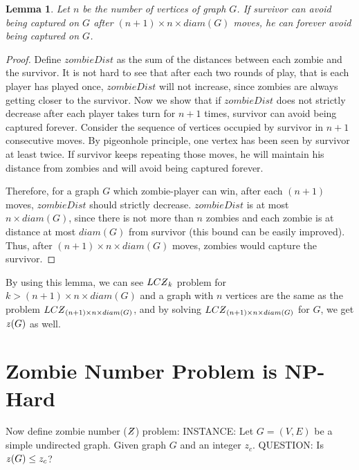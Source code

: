 \documentclass[1p]{elsarticle}
\newtheorem{lemma}[theorem]{Lemma}
\newcommand{\NPZ}{\ooalign{$Z$\cr\hfil\rule[.8ex]{.3em}{.09ex}\hfil\cr}}
\newcommand{\zn}{\ooalign{$z$\cr\hfil\rule[.5ex]{.2em}{.08ex}\hfil\cr}}
\begin{document}
	\begin{lemma}
		\label{limit-moves}
		Let $n$ be the number of vertices of graph $G$. If survivor can avoid being captured on $G$ after $(n + 1)
		\times n \times diam(G)$ moves, he can forever avoid being captured on $G$.
	\end{lemma}
	\begin{proof}
		Define $zombieDist$ as the sum of the distances between each zombie and the survivor. It is not hard to see that
		after each two rounds of play, that is each player has played once, $zombieDist$ will not increase, since
		zombies are always getting closer to the survivor. Now we show that if $zombieDist$ does not strictly decrease
		after each player takes turn for $n + 1$ times, survivor can avoid being captured forever. Consider the sequence
		of vertices occupied by survivor in $n + 1$ consecutive moves. By pigeonhole principle, one vertex has been seen
		by survivor at least twice. If survivor keeps repeating those moves, he will maintain his distance from zombies
		and will avoid being captured forever.

		Therefore, for a graph $G$ which zombie-player can win, after each $(n + 1)$ moves, $zombieDist$ should strictly
		decrease. $zombieDist$ is at most $n \times diam(G)$, since there is not more than $n$ zombies and each zombie is at distance
		at most $diam(G)$ from survivor (this bound can be easily improved). Thus, after $(n + 1) \times n \times diam(G)$ moves, zombies would
		capture the survivor.
	\end{proof}

	By using this lemma, we can see $LC\NPZ_k$ problem for $k > (n + 1) \times n \times diam(G)$ and a graph with $n$ vertices are the same as
	the problem $LC\NPZ_{(n + 1) \times n \times diam(G)}$, and by solving $LC\NPZ_{(n + 1) \times n \times diam(G)}$ for $G$, we get $\zn(G)$ as well.


	
	\section{Zombie Number Problem is NP-Hard}\label{np-zombienumber}

	Now define zombie number ($\NPZ$) problem:
	{\newline}
	INSTANCE: Let $G = (V,E)$ be a simple undirected graph. Given graph $G$ and an integer $z_c$.
	{\newline}
	QUESTION: Is $\zn (G) \leq z_c$?
\end{document}
